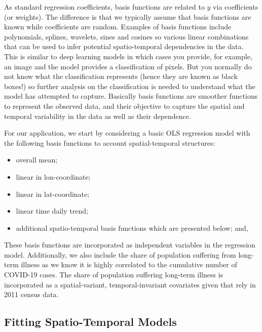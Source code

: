 \documentclass[
]{book}
\providecommand{\tightlist}{%
  \setlength{\itemsep}{0pt}\setlength{\parskip}{0pt}}
\begin{document}
As standard regression coefficients, basis functions are related to \(y\) via coefficients (or weights). The difference is that we typically assume that basis functions are known while coefficients are random. Examples of basis functions include polynomials, splines, wavelets, sines and cosines so various linear combinations that can be used to infer potential spatio-temporal dependencies in the data. This is similar to deep learning models in which cases you provide, for example, an image and the model provides a classification of pixels. But you normally do not know what the classification represents (hence they are known as black boxes!) so further analysis on the classification is needed to understand what the model has attempted to capture. Basically basis functions are smoother functions to represent the observed data, and their objective to capture the spatial and temporal variability in the data as well as their dependence.

For our application, we start by considering a basic OLS regression model with the following basis functions to account spatial-temporal structures:

\begin{itemize}
\tightlist
\item
  overall mean;
\item
  linear in lon-coordinate;
\item
  linear in lat-coordinate;
\item
  linear time daily trend;
\item
  additional spatio-temporal basis functions which are presented below; and,
\end{itemize}

These basis functions are incorporated as independent variables in the regression model. Additionally, we also include the share of population suffering from long-term illness as we know it is highly correlated to the cumulative number of COVID-19 cases. The share of population suffering long-term illness is incorporated as a spatial-variant, temporal-invariant covariates given that rely in 2011 census data.

\hypertarget{fitting-spatio-temporal-models}{%
\subsection{Fitting Spatio-Temporal Models}\label{fitting-spatio-temporal-models}}
\end{document}
